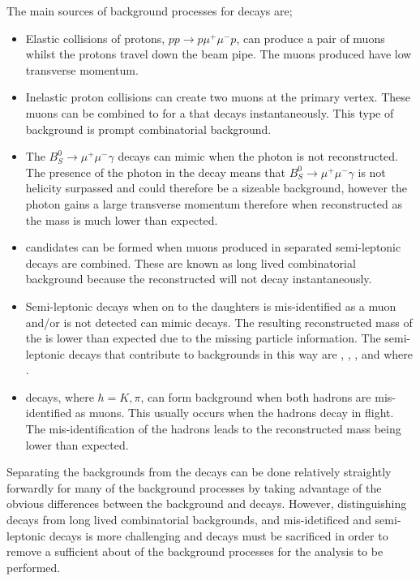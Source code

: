 The main sources of background processes for \bsmumu decays are;
\begin{itemize}
\item Elastic collisions of protons, $pp \to p \mu^+{} \mu^{-} p$, can produce a pair of muons whilst the protons travel down the beam pipe. The muons produced have low transverse momentum.
\item Inelastic proton collisions can create two muons at the primary vertex. These muons can be combined to for a \bs that decays instantaneously. This type of background is prompt  combinatorial background. 
\item The $B_{S}^{0}\to\mu^{+}\mu^{-}\gamma$ decays can mimic \bsmumu when the photon is not reconstructed. The presence of the photon in the decay means that $B_{S}^{0}\to\mu^{+}\mu^{-}\gamma$ is not helicity surpassed and could therefore be a sizeable background, however the photon gains a large transverse momentum therefore when reconstructed as \bsmumu the \bs mass is much lower than expected.
\item \bsmumu candidates can be formed when muons produced in separated semi-leptonic decays are combined. These are known as long lived combinatorial background because the reconstructed \bs will not decay instantaneously.
\item Semi-leptonic decays when on to the daughters is mis-identified as a muon and/or is not detected can mimic \bsmumu decays. The resulting reconstructed mass of the \bs is lower than expected due to the missing particle information. The semi-leptonic decays that contribute to \bsmumu backgrounds in this way are \bdpimunu, \bsKmunu, \bpimumu, \bdpimumu and \bcjpsimunu where \jpsimumu.
\item \bhh decays, where $ h  = K, \pi$, can form background when both hadrons are mis-identified as muons. This usually occurs when the hadrons decay in flight. The mis-identification of the hadrons leads to the reconstructed \bs mass being lower than expected.
\end{itemize}

Separating the backgrounds from the \bsmumu decays can be done relatively straightly forwardly for many of the background processes by taking advantage of the obvious differences between the background and \bsmumu decays. However, distinguishing \bsmumu decays from long lived combinatorial backgrounds, and mis-idetificed \bhh and semi-leptonic decays is more challenging and \bsmumu decays must be sacrificed in order to remove a sufficient about of the background processes for the analysis to be performed. 

